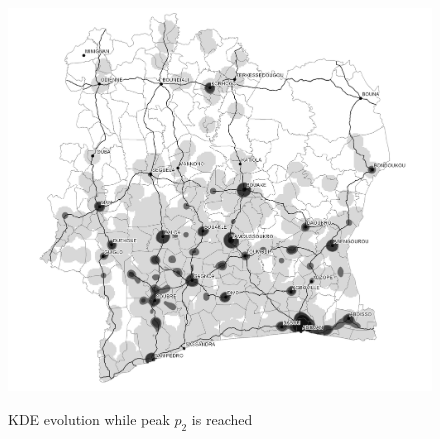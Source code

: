 \begin{figure}
{    \includegraphics[scale = 0.3]{results/images/kernel/l_hour19_kd.pdf}
	\label{fig:subfig1}
}
\caption[KDE evolution while peak $p_2$ is reached]{KDE evolution while peak $p_2$ is reached}
\label{fig:subfigureExample}
\end{figure}






